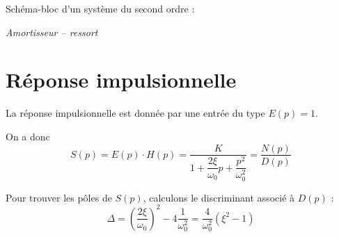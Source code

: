 \documentclass[10pt]{article}
\newif\ifprof
\begin{document}
Schéma-bloc d'un système du second ordre :


\begin{center}
\end{center}


\begin{exemple}

\textit{Amortisseur -- ressort}

\ifprof
On considère que la force $f(t)$ est l'entrée du système et que $y(t)$ est la
valeur de sortie. $y(t)$ est la position mesurée par rapport à la position
d'équilibre. 

En isolant la masse $M$ et en appliquant le théorème de la résultante
dynamique, on obtient : 
$$
f(t)-ky(t)-\mu\dot{y}(t) = M\ddot{y}(t) 
$$

On obtient ainsi une équation classique de la mécanique vibratoire où on pose. En passant dans le domaine de Laplace, on a alors: 
$$
F(p)-kY(p)-\mu p Y(p) = Mp^2Y(p) 
\Longleftrightarrow
F(p)= Y(p) \left( Mp^2 + k + \mu p \right)
$$

On peut donc obtenir $H$ puis sa forme canonique :
$$
H(p)=\dfrac{Y(p)}{F(p)} 
= \dfrac{1}{k + \mu p + Mp^2}
= \dfrac{\dfrac{1}{k}}{1 + \dfrac{\mu}{k} p + \dfrac{M}{k}p^2}
$$

Par identification on a donc :
$$K=\dfrac{1}{k} \quad \quad 
\omega_0=\sqrt{\dfrac{k}{M}}\quad  \quad 
\xi=\dfrac{\mu}{2k} \sqrt{\dfrac{k}{M}}
=\dfrac{\mu}{2\sqrt{kM}}
$$

\else
{}
\fi

\end{exemple}


\section{Réponse impulsionnelle}
La réponse impulsionnelle est donnée par une entrée du type $E(p)=1$.

On a donc 
$$
S(p)=E(p)\cdot H(p) = \dfrac{K}{1+ \dfrac{2\xi}{\omega_0}p+\dfrac{p^2}{\omega_0^2}}
=\dfrac{N(p)}{D(p)}
$$

Pour trouver les pôles de $S(p)$, calculons le discriminant associé à $D(p)$ :
$$
\Delta  = \left( \dfrac{2\xi}{\omega_0}\right)^2-4\dfrac{1}{\omega_0^2}
=\dfrac{4}{\omega_0^2}\left( \xi^2 -1\right)
$$
\end{document}
